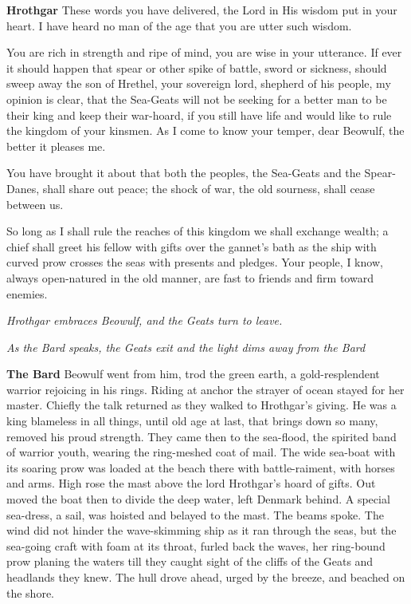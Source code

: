 \documentclass[a4paper]{article}
\begin{document}
{\textbf{Hrothgar} These words you have delivered, the Lord in His wisdom
put in your heart. I have heard no man
of the age that you are utter such wisdom.

You are rich in strength and ripe of mind,
you are wise in your utterance. If ever it should happen
that spear or other spike of battle,
sword or sickness, should sweep away
the son of Hrethel, your sovereign lord,
shepherd of his people, my opinion is clear,
that the Sea-Geats will not be seeking for a better
man to be their king and keep their war-hoard,
if you still have life and would like to rule
the kingdom of your kinsmen. As I come to know
your temper, dear Beowulf, the better it pleases me.

You have brought it about that both the peoples,
the Sea-Geats and the Spear-Danes,
shall share out peace; the shock of war,
the old sourness, shall cease between us.

So long as I shall rule the reaches of this kingdom
we shall exchange wealth; a chief shall greet
his fellow with gifts over the gannet’s bath
as the ship with curved prow crosses the seas
with presents and pledges. Your people, I know,
always open-natured in the old manner,
are fast to friends and firm toward enemies.

\centerline{\textit{Hrothgar embraces Beowulf, and the Geats turn to leave.}}
\centerline{\textit{As the Bard speaks, the Geats exit and the light dims away from the Bard}}

\textbf{The Bard}  Beowulf went from him,
trod the green earth, a gold-resplendent warrior
rejoicing in his rings. Riding at anchor
the strayer of ocean stayed for her master.
Chiefly the talk returned as they walked
to Hrothgar’s giving. He was a king
blameless in all things, until old age at last,
that brings down so many, removed his proud strength.
They came then to the sea-flood, the spirited
band
of warrior youth, wearing the ring-meshed
coat of mail.
The wide sea-boat with its soaring prow
was loaded at the beach there with battle-raiment,
with horses and arms. High rose the mast
above the lord Hrothgar’s hoard of gifts.
Out moved the boat then
to divide the deep water, left Denmark behind.
A special sea-dress, a sail, was hoisted
and belayed to the mast. The beams spoke.
The wind did not hinder the wave-skimming ship
as it ran through the seas, but the sea-going craft
with foam at its throat, furled back the waves,
her ring-bound prow planing the waters
till they caught sight of the cliffs of the Geats
and headlands they knew. The hull drove ahead,
urged by the breeze, and beached on the shore.

}
\end{document}
